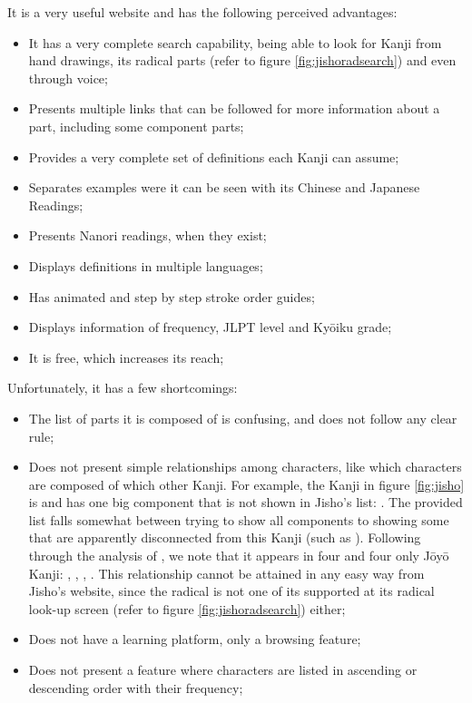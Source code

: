 It is a very useful website and has the following perceived advantages:
\begin{itemize}
    \item It has a very complete search capability, being able to look for Kanji from hand drawings, its radical parts (refer to figure \ref{fig:jishoradsearch}) and even through voice;
    \item Presents multiple links that can be followed for more information about a part, including some component parts;
    \item Provides a very complete set of definitions each Kanji can assume;
    \item Separates examples were it can be seen with its Chinese and Japanese Readings;
    \item Presents Nanori readings, when they exist;
    \item Displays definitions in multiple languages;
    \item Has animated and step by step stroke order guides;
    \item Displays information of frequency, JLPT level and Ky\={o}iku grade;
    \item It is free, which increases its reach;
\end{itemize}

Unfortunately, it has a few shortcomings:
\begin{itemize}
    \item The list of parts it is composed of is confusing, and does not follow any clear rule;
    \item Does not present simple relationships among characters, like which characters are composed of which other Kanji. For example, the Kanji in figure \ref{fig:jisho} is  and has one big component that is not shown in Jisho's list: . The provided list falls somewhat between trying to show all components to showing some that are apparently disconnected from this Kanji (such as ). Following through the analysis of , we note that it appears in four and four only J\={o}y\={o} Kanji: , , , . This relationship cannot be attained in any easy way from Jisho's website, since the radical  is not one of its supported at its radical look-up screen (refer to figure \ref{fig:jishoradsearch}) either;
    \item Does not have a learning platform, only a browsing feature;
    \item Does not present a feature where characters are listed in ascending or descending order with their frequency;
\end{itemize}

